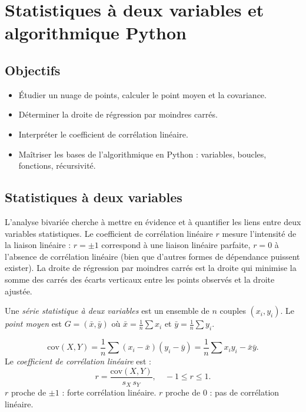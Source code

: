 \documentclass[11pt,a4paper,twoside]{book}
\begin{document}
\chapter{Statistiques à deux variables et algorithmique Python}

\section*{Objectifs}
\begin{itemize}[leftmargin=1.5em]
  \item Étudier un nuage de points, calculer le point moyen et la covariance.
  \item Déterminer la droite de régression par moindres carrés.
  \item Interpréter le coefficient de corrélation linéaire.
  \item Maîtriser les bases de l'algorithmique en Python : variables, boucles, fonctions, récursivité.
\end{itemize}

\section{Statistiques à deux variables}

L'analyse bivariée cherche à mettre en évidence et à quantifier les liens entre deux variables statistiques. Le coefficient de corrélation linéaire $r$ mesure l'intensité de la liaison linéaire : $r = \pm 1$ correspond à une liaison linéaire parfaite, $r = 0$ à l'absence de corrélation linéaire (bien que d'autres formes de dépendance puissent exister). La droite de régression par moindres carrés est la droite qui minimise la somme des carrés des écarts verticaux entre les points observés et la droite ajustée.

\begin{definitionbox}
Une \emph{série statistique à deux variables} est un ensemble de $n$ couples $(x_i,y_i)$.
Le \emph{point moyen} est $G = (\bar{x},\bar{y})$ où $\bar{x}=\frac{1}{n}\sum x_i$ et $\bar{y}=\frac{1}{n}\sum y_i$.
\end{definitionbox}

\begin{definitionbox}
\[
  \mathrm{cov}(X,Y) = \frac{1}{n}\sum(x_i-\bar{x})(y_i-\bar{y}) = \frac{1}{n}\sum x_i y_i - \bar{x}\bar{y}.
\]
Le \emph{coefficient de corrélation linéaire} est :
\[
  r = \frac{\mathrm{cov}(X,Y)}{s_X\,s_Y}, \quad -1 \leq r \leq 1.
\]
$r$ proche de $\pm1$ : forte corrélation linéaire. $r$ proche de $0$ : pas de corrélation linéaire.
\end{definitionbox}
\end{document}
